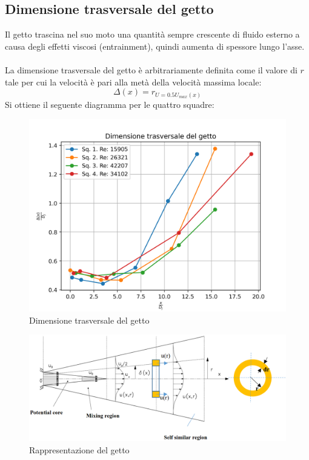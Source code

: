 \subsection{Dimensione trasversale del getto}
Il getto trascina nel suo moto una quantità sempre crescente di fluido esterno a causa degli effetti viscosi (entrainment), quindi aumenta di spessore lungo l'asse.\\\\
La dimensione trasversale del getto è arbitrariamente definita come il valore di $r$ tale per cui la velocità è pari alla metà della velocità massima locale:
\begin{equation*}
    \Delta (x) = r_{U=0.5U_{max}(x)}
\end{equation*}
Si ottiene il seguente diagramma per le quattro squadre:
\begin{figure}[H]
    \centering
    \includegraphics[width=.7\textwidth]{images/4/delta.png}
    \caption{Dimensione trasversale del getto}
\end{figure}
\begin{figure}[H]
    \centering
    \includegraphics[width=.8\linewidth]{images/4/getto.png}
    \caption{Rappresentazione del getto}
\end{figure}

